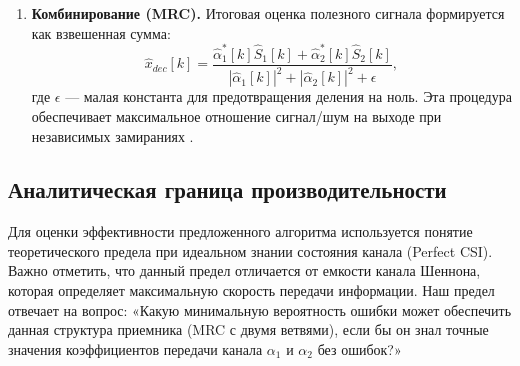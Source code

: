 \documentclass[a4paper,12pt]{article}
\numberwithin{equation}{section}
\begin{document}
\begin{enumerate}
    \textit{Пояснение:} Оценка канала выполняется \textit{только после} разделения; попытка оценить $\alpha_1$ и $\alpha_2$ до разделения приводит к интерференции пилотов со случайными фазами. Поскольку обе реплики излучаются одним ЦАП и проходят через общий радиотракт, их символьная синхронизация и циклический префикс (CP) совпадают, а остаточная разность задержек/фаз между зонами поглощается комплексными коэффициентами $\alpha_1[k], \alpha_2[k]$ при МНК-оценке \cite{proakis}.

    
    \item \textbf{Комбинирование (MRC).} Итоговая оценка полезного сигнала формируется как взвешенная сумма:
    \begin{equation}
    \hat{x}_{dec}[k] = \frac{\hat{\alpha}_1^*[k] \hat{S}_1[k] + \hat{\alpha}_2^*[k] \hat{S}_2[k]}{|\hat{\alpha}_1[k]|^2 + |\hat{\alpha}_2[k]|^2 + \epsilon},
    \end{equation}
    где $\epsilon$ — малая константа для предотвращения деления на ноль. Эта процедура обеспечивает максимальное отношение сигнал/шум на выходе при независимых замираниях \cite{proakis}.
\end{enumerate}

\subsection{Аналитическая граница производительности}
Для оценки эффективности предложенного алгоритма используется понятие теоретического предела при идеальном знании состояния канала (Perfect CSI). Важно отметить, что данный предел отличается от емкости канала Шеннона, которая определяет максимальную скорость передачи информации. Наш предел отвечает на вопрос: «Какую минимальную вероятность ошибки может обеспечить данная структура приемника (MRC с двумя ветвями), если бы он знал точные значения коэффициентов передачи канала $\alpha_1$ и $\alpha_2$ без ошибок?»
\end{document}
